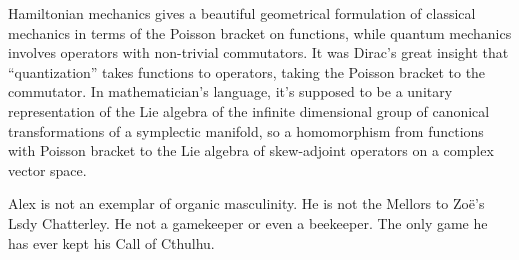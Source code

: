 Hamiltonian mechanics gives a beautiful geometrical formulation of classical mechanics in terms of the Poisson bracket on functions, while quantum mechanics involves operators with non-trivial commutators. It was Dirac’s great insight that “quantization” takes functions to operators, taking the Poisson bracket to the commutator. In mathematician’s language, it’s supposed to be a unitary representation of the Lie algebra of the infinite dimensional group of canonical transformations of a symplectic manifold, so a homomorphism from functions with Poisson bracket to the Lie algebra of skew-adjoint operators on a complex vector space.

Alex is not an exemplar of organic masculinity. He is not the Mellors to Zoë's Lsdy Chatterley. He not a gamekeeper or even a beekeeper. The only game he has ever kept his {\twelvesl Call of Cthulhu}.
 \vfill\eject
